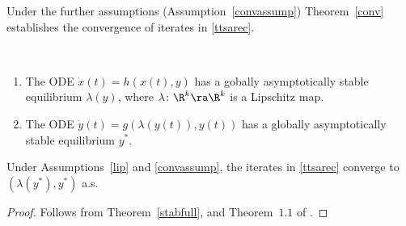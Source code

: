Under the further assumptions (Assumption~\ref{convassump}) Theorem~\ref{conv} establishes the convergence of iterates in \eqref{ttsarec}.
\begin{assumption}\label{convassump}
\mbox{ }
\begin{enumerate}
\item The ODE $\dot{x}(t)=h(x(t),y)$ has a gobally asymptotically stable equilibrium $\lambda(y)$, where $\lambda \colon \R^k \ra \R^k$ is a Lipschitz map.
\item The ODE $\dot{y}(t)=g(\lambda(y(t)),y(t))$ has a globally asymptotically stable equilibrium $y^*$.
\end{enumerate}
\end{assumption}
\begin{theorem}\label{conv}
Under Assumptions~\ref{lip} and \ref{convassump}, the iterates in \eqref{ttsarec} converge to $(\lambda(y^*),y^*)$ a.s. 
\end{theorem}
\begin{proof}
Follows from Theorem~\ref{stabfull}, and Theorem~$1.1$ of \cite{TTSAP}.
\end{proof}
